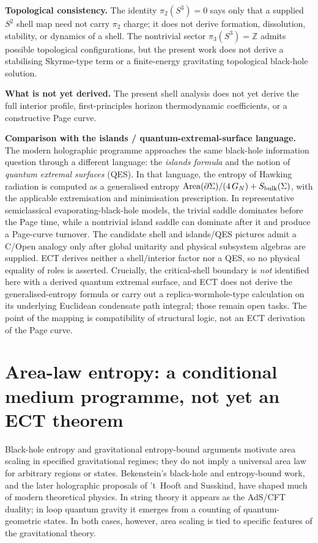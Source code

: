 \documentclass[11pt,a4paper]{article}
\begin{document}
\textbf{Topological consistency.}
The identity $\pi_2(S^3)=0$ says only that a supplied $S^2$ shell map need not carry $\pi_2$ charge; it does not derive formation, dissolution, stability, or dynamics of a shell.
The nontrivial sector $\pi_3(S^3) = \mathbb{Z}$ admits possible topological configurations, but the present work does not derive a stabilising Skyrme-type term or a finite-energy gravitating topological black-hole solution.

\textbf{What is not yet derived.}
The present shell analysis does not yet derive the full interior profile, first-principles horizon thermodynamic coefficients, or a constructive Page curve.

\textbf{Comparison with the islands / quantum-extremal-surface language.}
The modern holographic programme approaches the same black-hole
information question through a different language: the \emph{islands
formula} and the notion of \emph{quantum extremal surfaces} (QES).
In that language, the entropy of Hawking radiation is computed as a
generalised entropy
$\mathrm{Area}(\partial\Sigma)/(4\,G_N)+S_{\rm bulk}(\Sigma)$, with the
applicable extremisation and minimisation prescription.  In representative
semiclassical evaporating-black-hole models, the trivial saddle dominates
before the Page time, while a nontrivial island saddle can dominate after it
and produce a Page-curve turnover.
The candidate shell and islands/QES pictures admit a C/Open analogy
only after global unitarity and physical subsystem algebras are
supplied.  ECT derives neither a shell/interior factor nor a QES, so no
physical equality of roles is asserted.
Crucially, the critical-shell boundary is \emph{not} identified here
with a derived quantum extremal surface, and ECT does not derive
the generalised-entropy formula or carry out a replica-wormhole-type
calculation on its underlying Euclidean condensate path integral;
those remain open tasks. The point of the mapping is compatibility
of structural logic, not an ECT derivation of the Page curve.

\section{Area-law entropy: a conditional medium programme, not yet an ECT theorem}
\label{sec:pop_area_law}

Black-hole entropy and gravitational entropy-bound arguments motivate area
scaling in specified gravitational regimes; they do not imply a universal
area law for arbitrary regions or states.  Bekenstein's black-hole and
entropy-bound work, and the later holographic proposals of 't~Hooft and
Susskind, have shaped much of modern theoretical physics.
In string theory it appears as the AdS/CFT duality; in loop quantum
gravity it emerges from a counting of quantum-geometric states.
In both cases, however, area scaling is tied to specific features of
the gravitational theory.
\end{document}

